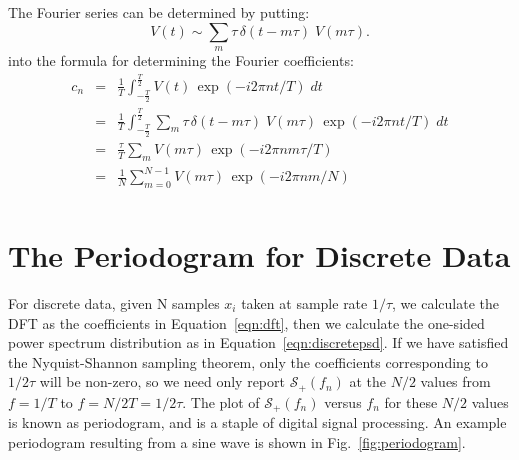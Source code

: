 \documentclass[12pt,oneside]{book}
\begin{document}
The Fourier series can be determined by putting:
\begin{displaymath}
V(t) \sim \sum_m \tau \, \delta(t-m\tau) \; V(m\tau).
\end{displaymath}
into the formula for determining the Fourier coefficients:
\begin{eqnarray*}
c_n &=& \frac{1}{T} \int_{-\frac{T}{2}}^{\frac{T}{2}}  V(t) \, \exp(-i 2\pi n t / T) \; dt \\
 &=& \frac{1}{T} \int_{-\frac{T}{2}}^{\frac{T}{2}}    \sum_m \tau \, \delta(t-m\tau) \; V(m\tau) \, \exp(-i 2\pi n t / T) \; dt \\ 
 &=& \frac{\tau}{T} \sum_m  V(m\tau) \, \exp(-i 2\pi n m \tau  / T) \\
 &=& \frac{1}{N} \sum_{m=0}^{N-1}  V(m\tau) \, \exp(-i 2\pi n m / N)  \\
\end{eqnarray*}

\section{The Periodogram for Discrete Data}

For discrete data, given N samples $x_i$ taken at sample rate $1/\tau$, we calculate the DFT as the coefficients in Equation~\ref{eqn:dft}, then we calculate the one-sided power spectrum distribution as in Equation~\ref{eqn:discretepsd}.  If we have satisfied the Nyquist-Shannon sampling theorem, only the coefficients corresponding to $1/2\tau$ will be non-zero, so we need only report $\mathcal{S}_{+}(f_n)$ at the $N/2$ values from $f=1/T$ to $f=N/2T=1/2\tau$.  The plot of $\mathcal{S}_{+}(f_n)$ versus $f_n$ for these $N/2$ values is known as periodogram, and is a staple of digital signal processing.  An example periodogram resulting from a sine wave is shown in Fig.~\ref{fig:periodogram}.
\end{document}
